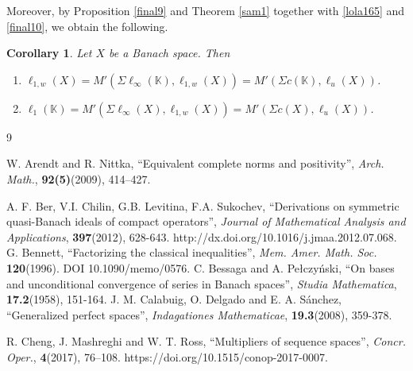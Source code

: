 \documentclass[14pt, a4paper]{article}  %
\providecommand{\pare}[1]{\left( #1\right) }
\newcommand{\K}{\mathbb{K}}
\newtheorem{corollary}{Corollary}[section]
\begin{document}
Moreover, by Proposition \ref{final9} and Theorem \ref{sam1} together with \eqref{lola165} and \eqref{final10}, we obtain the following.
\begin{corollary}
	Let $X$ be a Banach space. Then
	\begin{enumerate}
		\item[i.] $\ell_{1,w}\pare{X}=M'\pare{\Sigma \ell_{\infty}\pare{\K},\ell_{1,w}\pare{X}}=M'\pare{\Sigma c\pare{\K},\ell_{u}\pare{X}}$.
		\item[ii.] $\ell_{1}\pare{\K}=M'\pare{\Sigma \ell_{\infty}\pare{X},\ell_{1,w}\pare{X}}=M'\pare{\Sigma c\pare{X},\ell_{u}\pare{X}}$.
	\end{enumerate}
\end{corollary}

 \begin{thebibliography}{9}  
 
  W. Arendt and R. Nittka, ``Equivalent complete norms and positivity'', \emph{Arch. Math.}, \textbf{92(5)}(2009), 414–427.
 
% 
  	A. F. Ber,  V.I. Chilin, G.B. Levitina, F.A. Sukochev, ``Derivations on symmetric quasi-Banach ideals of compact operators'', \emph{Journal of Mathematical Analysis and Applications}, \textbf{397}(2012), 628-643. http://dx.doi.org/10.1016/j.jmaa.2012.07.068.
% 
  G. Bennett,  ``Factorizing the classical inequalities'', \emph{Mem. Amer. Math. Soc.} \textbf{120}(1996). DOI 10.1090/memo/0576. 
% 
% 
  C. Bessaga and A. Pełczyński,  ``On bases and unconditional convergence of series in Banach spaces'', \emph{Studia Mathematica}, \textbf{17.2}(1958), 151-164.
% 
% 
% 
  J. M. Calabuig, O. Delgado and E. A. Sánchez,  ``Generalized perfect spaces'', \emph{Indagationes Mathematicae}, \textbf{19.3}(2008), 359-378.
 
  R. Cheng, J. Mashreghi and W. T. Ross, ``Multipliers of sequence spaces'',  \emph{Concr. Oper.}, \textbf{4}(2017), 76–108. https://doi.org/10.1515/conop-2017-0007.
% 
% 
% 
% 
% 
% 
% 


\end{thebibliography}
\end{document}
